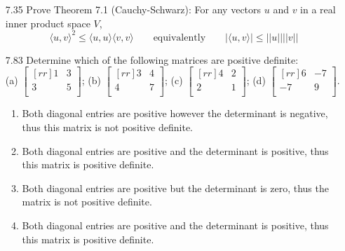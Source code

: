 \documentclass[12pt]{article}
\theoremstyle{plain}
\theoremstyle{definition}
\theoremstyle{plain}
\begin{document}
\begin{enumerate}
\item[7.35]Prove Theorem 7.1 (Cauchy-Schwarz): For any vectors $u$ and $v$ in a real inner product space $V$,
\[ \langle u,v \rangle^2 \leq \langle u,u\rangle \langle v,v\rangle \qquad \mathrm{equivalently} \qquad |\langle u,v \rangle | \leq ||u|| ||v|| \]

\item[7.83]Determine which of the following matrices are positive definite:\\
(a) $\begin{bmatrix}[rr]1&3\\3&5\\\end{bmatrix}$; (b) $\begin{bmatrix}[rr]3&4\\4&7\\\end{bmatrix}$; (c) $\begin{bmatrix}[rr]4&2\\2&1\\\end{bmatrix}$; (d) $\begin{bmatrix}[rr]6&-7\\-7&9\\\end{bmatrix}$.
	\begin{enumerate}
	\item Both diagonal entries are positive however the determinant is negative, thus this matrix is not positive definite.
	\item Both diagonal entries are positive and the determinant is positive, thus this matrix is positive definite.
	\item Both diagonal entries are positive but the determinant is zero, thus the matrix is not positive definite.
	\item Both diagonal entries are positive and the determinant is positive, thus this matrix is positive definite.
	\end{enumerate}
	

\end{enumerate}
\end{document}
